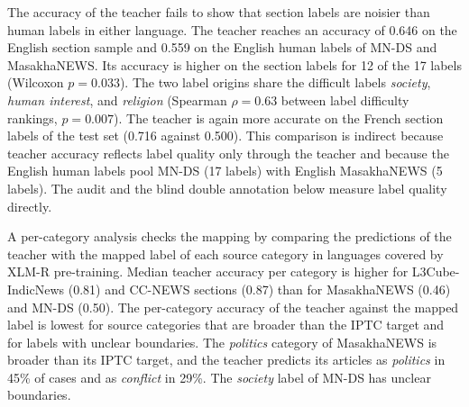 \documentclass{ieeeaccess}
\begin{document}
The accuracy of the teacher fails to show that section labels are noisier than human labels in either language. The teacher reaches an accuracy of 0.646 on the English section sample and 0.559 on the English human labels of MN-DS and MasakhaNEWS. Its accuracy is higher on the section labels for 12 of the 17 labels (Wilcoxon $p=0.033$). The two label origins share the difficult labels \emph{society}, \emph{human interest}, and \emph{religion} (Spearman $\rho=0.63$ between label difficulty rankings, $p=0.007$). The teacher is again more accurate on the French section labels of the test set (0.716 against 0.500). This comparison is indirect because teacher accuracy reflects label quality only through the teacher and because the English human labels pool MN-DS (17 labels) with English MasakhaNEWS (5 labels). The audit and the blind double annotation below measure label quality directly.

A per-category analysis checks the mapping by comparing the predictions of the teacher with the mapped label of each source category in languages covered by XLM-R pre-training. Median teacher accuracy per category is higher for L3Cube-IndicNews (0.81) and CC-NEWS sections (0.87) than for MasakhaNEWS (0.46) and MN-DS (0.50). The per-category accuracy of the teacher against the mapped label is lowest for source categories that are broader than the IPTC target and for labels with unclear boundaries. The \emph{politics} category of MasakhaNEWS is broader than its IPTC target, and the teacher predicts its articles as \emph{politics} in 45\% of cases and as \emph{conflict} in 29\%. The \emph{society} label of MN-DS has unclear boundaries.
\end{document}
